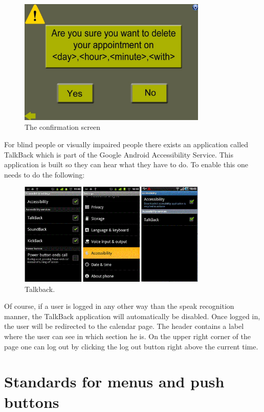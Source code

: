 \documentclass[11pt, a4paper,svglistings]{report}
\begin{document}
\begin{figure}[H]
\centering
    \includegraphics[width=0.8\textwidth]{Confirmation.jpg}
  \caption[Confirmation screen]{\label{fig:ConfirmationScreen} The confirmation screen}
\end{figure}

For blind people or visually impaired people there exists an application called TalkBack which is part of the Google Android Accessibility Service. This application is built so they can hear what they have to do. To enable this one needs to do the following:

\begin{figure}[H]
\centering
    \includegraphics[width=0.8\textwidth]{Talkback.png}
  \caption[Talkback]{\label{fig:Talkback} Talkback.}
\end{figure}

Of course, if a user is logged in any other way than the speak recognition manner, the TalkBack application will automatically be disabled.
Once logged in, the user will be redirected to the calendar page. The header contains a label where the user can see in which section he is. On the upper right corner of the page one can log out by clicking the log out button right above the current time.

\section{Standards for menus and push buttons}
\end{document}
